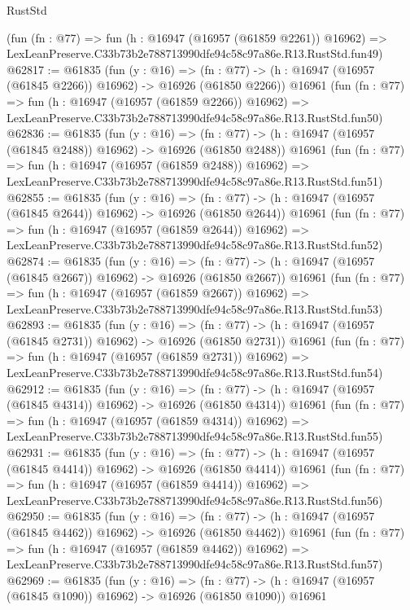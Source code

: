 \begin{lexlean}{RustStd}
\begin{coremodule}
    (fun (fn : @77) =>
    fun (h : @16947 (@16957 (@61859 @2261)) @16962) =>
    LexLeanPreserve.C33b73b2e788713990dfe94c58c97a86e.R13.RustStd.fun49)
@62817 := @61835
    (fun (y : @16) =>
    (fn : @77) -> (h : @16947 (@16957 (@61845 @2266)) @16962) -> @16926 (@61850 @2266))
    @16961
    (fun (fn : @77) =>
    fun (h : @16947 (@16957 (@61859 @2266)) @16962) =>
    LexLeanPreserve.C33b73b2e788713990dfe94c58c97a86e.R13.RustStd.fun50)
@62836 := @61835
    (fun (y : @16) =>
    (fn : @77) -> (h : @16947 (@16957 (@61845 @2488)) @16962) -> @16926 (@61850 @2488))
    @16961
    (fun (fn : @77) =>
    fun (h : @16947 (@16957 (@61859 @2488)) @16962) =>
    LexLeanPreserve.C33b73b2e788713990dfe94c58c97a86e.R13.RustStd.fun51)
@62855 := @61835
    (fun (y : @16) =>
    (fn : @77) -> (h : @16947 (@16957 (@61845 @2644)) @16962) -> @16926 (@61850 @2644))
    @16961
    (fun (fn : @77) =>
    fun (h : @16947 (@16957 (@61859 @2644)) @16962) =>
    LexLeanPreserve.C33b73b2e788713990dfe94c58c97a86e.R13.RustStd.fun52)
@62874 := @61835
    (fun (y : @16) =>
    (fn : @77) -> (h : @16947 (@16957 (@61845 @2667)) @16962) -> @16926 (@61850 @2667))
    @16961
    (fun (fn : @77) =>
    fun (h : @16947 (@16957 (@61859 @2667)) @16962) =>
    LexLeanPreserve.C33b73b2e788713990dfe94c58c97a86e.R13.RustStd.fun53)
@62893 := @61835
    (fun (y : @16) =>
    (fn : @77) -> (h : @16947 (@16957 (@61845 @2731)) @16962) -> @16926 (@61850 @2731))
    @16961
    (fun (fn : @77) =>
    fun (h : @16947 (@16957 (@61859 @2731)) @16962) =>
    LexLeanPreserve.C33b73b2e788713990dfe94c58c97a86e.R13.RustStd.fun54)
@62912 := @61835
    (fun (y : @16) =>
    (fn : @77) -> (h : @16947 (@16957 (@61845 @4314)) @16962) -> @16926 (@61850 @4314))
    @16961
    (fun (fn : @77) =>
    fun (h : @16947 (@16957 (@61859 @4314)) @16962) =>
    LexLeanPreserve.C33b73b2e788713990dfe94c58c97a86e.R13.RustStd.fun55)
@62931 := @61835
    (fun (y : @16) =>
    (fn : @77) -> (h : @16947 (@16957 (@61845 @4414)) @16962) -> @16926 (@61850 @4414))
    @16961
    (fun (fn : @77) =>
    fun (h : @16947 (@16957 (@61859 @4414)) @16962) =>
    LexLeanPreserve.C33b73b2e788713990dfe94c58c97a86e.R13.RustStd.fun56)
@62950 := @61835
    (fun (y : @16) =>
    (fn : @77) -> (h : @16947 (@16957 (@61845 @4462)) @16962) -> @16926 (@61850 @4462))
    @16961
    (fun (fn : @77) =>
    fun (h : @16947 (@16957 (@61859 @4462)) @16962) =>
    LexLeanPreserve.C33b73b2e788713990dfe94c58c97a86e.R13.RustStd.fun57)
@62969 := @61835
    (fun (y : @16) =>
    (fn : @77) -> (h : @16947 (@16957 (@61845 @1090)) @16962) -> @16926 (@61850 @1090))
    @16961

\end{coremodule}
\end{lexlean}
